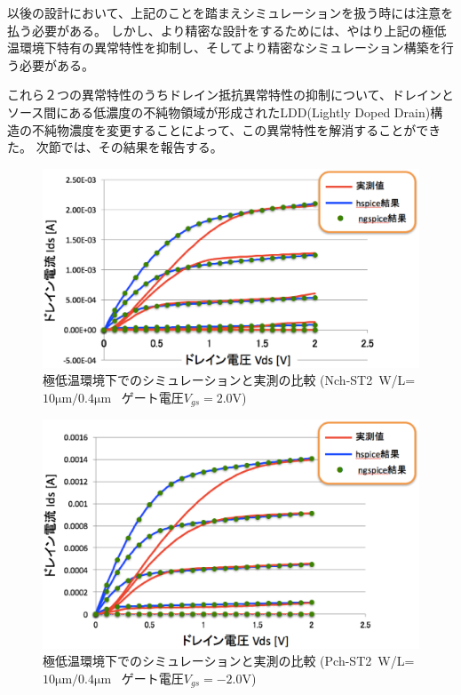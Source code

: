 			以後の設計において、上記のことを踏まえシミュレーションを扱う時には注意を払う必要がある。
			しかし、より精密な設計をするためには、やはり上記の極低温環境下特有の異常特性を抑制し、そしてより精密なシミュレーション構築を行う必要がある。
			
			これら２つの異常特性のうちドレイン抵抗異常特性の抑制について、ドレインとソース間にある低濃度の不純物領域が形成されたLDD(Lightly Doped Drain)構造の不純物濃度を変更することによって、この異常特性を解消することができた。
			次節では、その結果を報告する。
			
			\begin{figure}[htbp]
				\begin{center}
					\includegraphics[clip,width=15.0cm]{./Chapter/Chapter5/Picture/simVSmea_N.eps}
					\caption{極低温環境下でのシミュレーションと実測の比較 \newline (Nch-ST2\ W/L=$10\mathrm{\mu m}/0.4 \mathrm{\mu m}$ \ ゲート電圧$V_{gs}=2.0\mathrm{V}$)}
					\label{fig:simVSmea_N}
				\end{center}
			\end{figure}
			\begin{figure}[htbp]
				\begin{center}
					\includegraphics[clip,width=15.0cm]{./Chapter/Chapter5/Picture/simVSmea_P.eps}
					\caption{極低温環境下でのシミュレーションと実測の比較 \newline (Pch-ST2\ W/L=$10\mathrm{\mu m}/0.4 \mathrm{\mu m}$ \ ゲート電圧$V_{gs}=-2.0\mathrm{V}$)}
					\label{fig:simVSmea_P}
				\end{center}
			\end{figure}
			\clearpage
			
